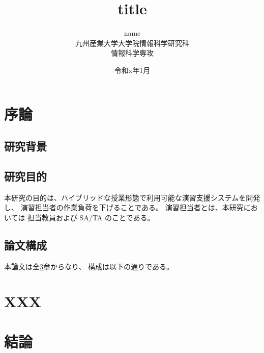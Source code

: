\documentclass[a4paper,12pt]{ujreport}
\title{
 \Huge{title}
 \vspace{4.5cm}\\
}
\author{
 \LARGE{name}\vspace{2cm}\\
 \LARGE{九州産業大学大学院情報科学研究科}\vspace{0.5cm}\\
 \LARGE{情報科学専攻}\vspace{1cm}\\
}
\date{\LARGE{令和x年1月}}
\begin{document}
\maketitle
\setcounter{page}{0}
\tableofcontents
\listoffigures
\listoftables
\clearpage
\setcounter{page}{0}


\chapter{序論}\label{chap:introduction}

\section{研究背景}\label{sec:background}

\section{研究目的}\label{sec:object}
本研究の目的は、ハイブリッドな授業形態で利用可能な演習支援システムを開発し、
演習担当者の作業負荷を下げることである。
演習担当者とは、本研究においては
担当教員および SA/TA のことである。

\section{論文構成}\label{sec:structure}

本論文は全\ref{chap:conclusion}章からなり、
構成は以下の通りである。


\chapter{XXX}\label{chap:xxx}

\chapter{結論}\label{chap:conclusion}


\end{document}
